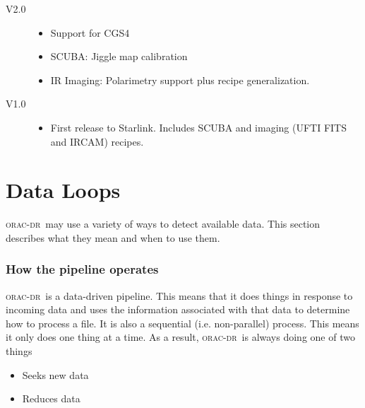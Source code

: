 \documentclass[twoside,11pt]{article}
\newcommand{\xlabel}[1]{}
\renewcommand{\_}{\texttt{\symbol{95}}}
\newcommand{\oracdr}{\textsc{orac-dr}}
\begin{document}
\begin{description}
\item[V2.0]

\begin{itemize}

\item Support for CGS4

\item SCUBA: Jiggle map calibration

\item IR Imaging: Polarimetry support plus recipe generalization.

\end{itemize}

\item[V1.0]

\begin{itemize}

\item First release to Starlink. Includes SCUBA and imaging (UFTI FITS
and IRCAM) recipes.

\end{itemize}

\end{description}


\appendix


\section{\xlabel{data_loops}Data Loops\label{Data_Loops}}

\oracdr\ may use a variety of ways to detect available data. This
section describes what they mean and when to use them.

\subsubsection*{How the pipeline operates\label{The_ORAC-DR_Data_Loops_How_the_pipeline_operates}}

\oracdr\ is a data-driven pipeline. This means that it does things in
response to incoming data and uses the information associated with
that data to determine how to process a file. It is also a sequential
(i.e. non-parallel) process. This means it only does one thing at a
time. As a result, \oracdr\ is always doing one of two things

\begin{itemize}
\item 

Seeks new data

\item 

Reduces data

\end{itemize}
\end{document}
